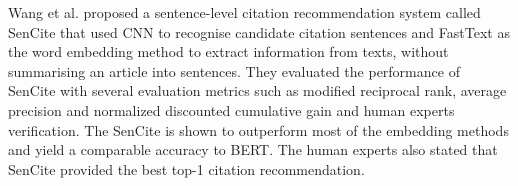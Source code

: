 Wang et al.\cite{wang2022} proposed a sentence-level citation recommendation system called SenCite that used CNN to recognise candidate citation sentences and FastText as the word embedding method to extract information from texts, without summarising an article into sentences.
They evaluated the performance of SenCite with several evaluation metrics such as modified reciprocal rank, average precision and normalized discounted cumulative gain and human experts verification.
The SenCite is shown to outperform most of the embedding methods and yield a comparable accuracy to BERT.
The human experts also stated that SenCite provided the best top-1 citation recommendation.